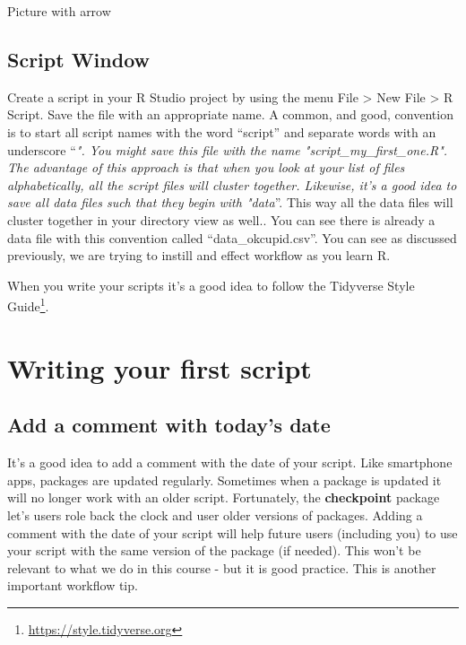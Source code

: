 \documentclass[
]{krantz}
\renewcommand{\href}[2]{#2\footnote{\url{#1}}}
\begin{document}
Picture with arrow

\hypertarget{script-window}{%
\subsection{Script Window}\label{script-window}}

Create a script in your R Studio project by using the menu File \textgreater{} New File \textgreater{} R Script.
Save the file with an appropriate name. A common, and good, convention is to start all script names with the word ``script'' and separate words with an underscore ``\emph{". You might save this file with the name "script\_my\_first\_one.R". The advantage of this approach is that when you look at your list of files alphabetically, all the script files will cluster together. Likewise, it's a good idea to save all data files such that they begin with "data}''. This way all the data files will cluster together in your directory view as well.. You can see there is already a data file with this convention called ``data\_okcupid.csv''. You can see as discussed previously, we are trying to instill and effect workflow as you learn R.

When you write your scripts it's a good idea to follow the \href{https://style.tidyverse.org}{Tidyverse Style Guide}.

\hypertarget{writing-your-first-script}{%
\section{Writing your first script}\label{writing-your-first-script}}

\hypertarget{add-a-comment-with-todays-date}{%
\subsection{Add a comment with today's date}\label{add-a-comment-with-todays-date}}

It's a good idea to add a comment with the date of your script. Like smartphone apps, packages are updated regularly. Sometimes when a package is updated it will no longer work with an older script. Fortunately, the \textbf{checkpoint} package let's users role back the clock and user older versions of packages. Adding a comment with the date of your script will help future users (including you) to use your script with the same version of the package (if needed). This won't be relevant to what we do in this course - but it is good practice. This is another important workflow tip.
\end{document}
